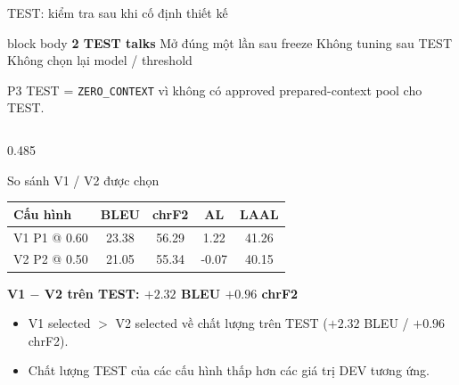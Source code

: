 \documentclass[aspectratio=169,11pt]{beamer}
\newcommand{\contextzero}{\texttt{ZERO\_CONTEXT}}
\begin{document}
\begin{frame}{TEST: kiểm tra sau khi cố định thiết kế}
  \begin{beamercolorbox}[rounded=true,sep=0.25em,center]{block body}
    \scriptsize
    \textbf{2 TEST talks} \;\textperiodcentered\; Mở đúng một lần sau freeze \;\textperiodcentered\; Không tuning sau TEST \;\textperiodcentered\; Không chọn lại model / threshold\par
    \tiny\color{TimelyGray}P3 TEST = \contextzero{} vì không có approved prepared-context pool cho TEST.
  \end{beamercolorbox}
  \vspace{0.15em}

  \begin{columns}[T,onlytextwidth]
    \begin{column}{0.485\textwidth}
      \begin{block}{So sánh V1 / V2 được chọn}
        \centering\scriptsize
        \begin{tabular}{lcccc}
          \toprule
          Cấu hình & BLEU & chrF2 & AL & LAAL \\
          \midrule
          V1 P1 @ 0.60 & 23.38 & 56.29 & 1.22 & 41.26 \\
          V2 P2 @ 0.50 & 21.05 & 55.34 & -0.07 & 40.15 \\
          \bottomrule
        \end{tabular}

        \vspace{0.2em}
        {\bfseries\color{TimelyTeal}V1 $-$ V2 trên TEST: $+2.32$ BLEU \quad $+0.96$ chrF2}
      \end{block}
      \vspace{0.1em}
      \scriptsize
      \begin{itemize}
        \setlength\itemsep{0.15em}
        \item V1 selected $>$ V2 selected về chất lượng trên TEST ($+2.32$ BLEU / $+0.96$ chrF2).
        \item Chất lượng TEST của các cấu hình thấp hơn các giá trị DEV tương ứng.
      \end{itemize}
    \end{column}


\end{columns}
\end{frame}
\end{document}

